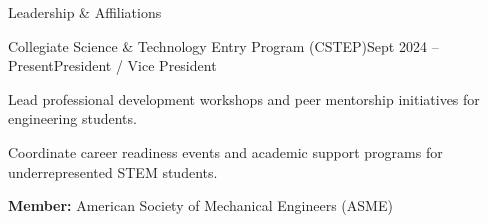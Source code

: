 \documentclass{resume}
\begin{document}
\begin{rSection}{Leadership \& Affiliations}
  \begin{rSubsection}{Collegiate Science \& Technology Entry Program (CSTEP)}{Sept 2024 -- Present}{President / Vice President}{}
    \item Lead professional development workshops and peer mentorship initiatives for engineering students.
    \item Coordinate career readiness events and academic support programs for underrepresented STEM students.
  \end{rSubsection}
  \textbf{Member:} American Society of Mechanical Engineers (ASME)
\end{rSection}
\end{document}
